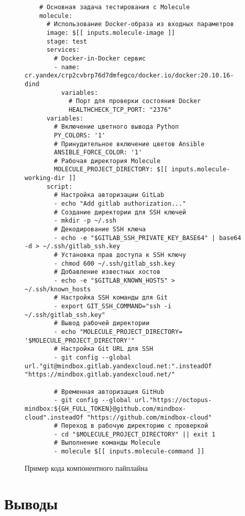 \begin{figure}[H]
\begin{verbatim}
    # Основная задача тестирования с Molecule
    molecule:
      # Использование Docker-образа из входных параметров
      image: $[[ inputs.molecule-image ]]
      stage: test
      services:
        # Docker-in-Docker сервис
        - name: cr.yandex/crp2cvbrp76d7dmfegco/docker.io/docker:20.10.16-dind
          variables:
            # Порт для проверки состояния Docker
            HEALTHCHECK_TCP_PORT: "2376"
      variables:
        # Включение цветного вывода Python
        PY_COLORS: '1'
        # Принудительное включение цветов Ansible
        ANSIBLE_FORCE_COLOR: '1'
        # Рабочая директория Molecule
        MOLECULE_PROJECT_DIRECTORY: $[[ inputs.molecule-working-dir ]]
      script:
        # Настройка авторизации GitLab
        - echo "Add gitlab authorization..."
        # Создание директории для SSH ключей
        - mkdir -p ~/.ssh
        # Декодирование SSH ключа
        - echo -e "$GITLAB_SSH_PRIVATE_KEY_BASE64" | base64 -d > ~/.ssh/gitlab_ssh.key
        # Установка прав доступа к SSH ключу
        - chmod 600 ~/.ssh/gitlab_ssh.key
        # Добавление известных хостов
        - echo -e "$GITLAB_KNOWN_HOSTS" > ~/.ssh/known_hosts
        # Настройка SSH команды для Git
        - export GIT_SSH_COMMAND="ssh -i ~/.ssh/gitlab_ssh.key"
        # Вывод рабочей директории
        - echo "MOLECULE_PROJECT_DIRECTORY= '$MOLECULE_PROJECT_DIRECTORY'"
        # Настройка Git URL для SSH
        - git config --global url."git@mindbox.gitlab.yandexcloud.net:".insteadOf "https://mindbox.gitlab.yandexcloud.net/"

        # Временная авторизация GitHub
        - git config --global url."https://octopus-mindbox:${GH_FULL_TOKEN}@github.com/mindbox-cloud".insteadOf "https://github.com/mindbox-cloud"
        # Переход в рабочую директорию с проверкой
        - cd "$MOLECULE_PROJECT_DIRECTORY" || exit 1
        # Выполнение команды Molecule
        - molecule $[[ inputs.molecule-command ]]
  \end{verbatim}
  \caption{Пример кода компонентного пайплайна}
  \label{fig:component-pipeline}
\end{figure}


\section{Выводы} \label{sec:conclusion}
